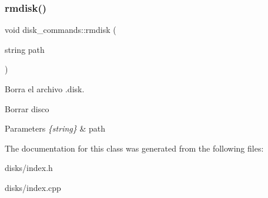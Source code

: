 \subsubsection{\texorpdfstring{rmdisk()}{rmdisk()}}
{\footnotesize\ttfamily void disk\+\_\+commands\+::rmdisk (\begin{DoxyParamCaption}\item[{string}]{path }\end{DoxyParamCaption})}



Borra el archivo .disk. 

Borrar disco 
\begin{DoxyParams}{Parameters}
{\em \{string\}} & path \\
\hline
\end{DoxyParams}


The documentation for this class was generated from the following files\+:\begin{DoxyCompactItemize}
\item 
disks/index.\+h\item 
disks/index.\+cpp\end{DoxyCompactItemize}

